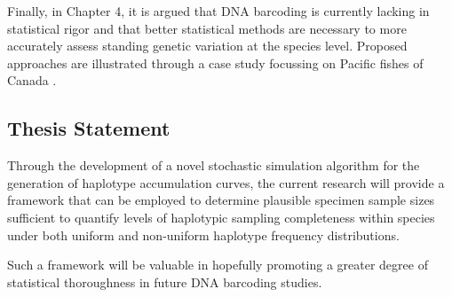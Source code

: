 Finally, in Chapter 4, it is argued that DNA barcoding is currently lacking in statistical rigor and that better statistical methods are necessary to more accurately assess standing genetic variation at the species level. Proposed approaches are illustrated through a case study focussing on Pacific fishes of Canada \cite{steinke2009dna}.


\subsection{Thesis Statement}

Through the development of a novel stochastic simulation algorithm for the generation of haplotype accumulation curves, the current research will provide a framework that can be employed to determine plausible specimen sample sizes sufficient to quantify levels of haplotypic sampling completeness within species under both uniform and non-uniform haplotype frequency distributions.

Such a framework will be valuable in hopefully promoting a greater degree of statistical thoroughness in future DNA barcoding studies. 



  

